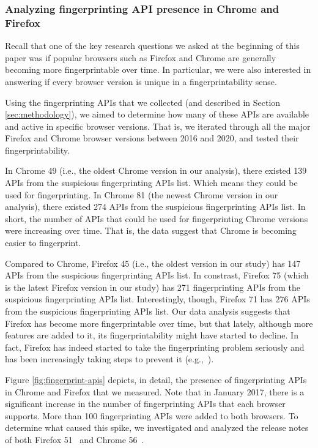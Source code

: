 \subsubsection{Analyzing fingerprinting API presence in Chrome and
  Firefox}

Recall that one of the key research questions we asked at the beginning of
this paper was if popular browsers such as Firefox and Chrome are
generally becoming more fingerprintable over time. In particular, we
were also interested in answering if every browser version is unique
in a fingerprintability sense.

Using the fingerprinting APIs that we collected (and described in
Section \ref{sec:methodology}), we aimed to determine how many of
these APIs are available and active in specific browser versions. That
is, we iterated through all the major Firefox and Chrome browser
versions between 2016 and 2020, and tested their fingerprintability.

In Chrome 49 (i.e., the oldest Chrome version in our analysis),
there existed 139 APIs from the suspicious fingerprinting APIs list. Which
means they could be used for fingerprinting. In Chrome
81 (the newest Chrome version in our analysis), there
existed 274 APIs from the suspicious fingerprinting APIs list. In short, the
number of APIs that could be used for fingerprinting Chrome versions
were increasing over time. That is, the data suggest that Chrome is
becoming easier to fingerprint.

Compared to Chrome, Firefox 45 (i.e., the oldest version in our study)
has 147 APIs from the suspicious fingerprinting APIs list. In constrast,
Firefox 75 (which is the latest Firefox version in our study) has 271
fingerprinting APIs from the suspicious fingerprinting APIs list.
Interestingly, though, Firefox 71 has 276 APIs from the suspicious
fingerprinting APIs list. Our data analysis suggests that
Firefox has become more fingerprintable over time, but that lately,
although more features are added to it, its fingerprintability might
have started to decline. In fact, Firefox has indeed started to take
the fingerprinting problem seriously and has been increasingly taking
steps to prevent it (e.g.,~\cite{FirefoxFingerprinting}).

Figure \ref{fig:fingerprint-apis} depicts, in detail, the presence of
fingerprinting APIs in Chrome and Firefox that we measured. Note that
in January 2017, there is a significant increase in the number of
fingerprinting APIs that each browser supports. More than 100
fingerprinting APIs were added to both browsers. To determine what
caused this spike, we investigated and analyzed the release notes of
both Firefox 51~\cite{firefox-51-notes} and Chrome
56~\cite{chrome-56-notes}.

